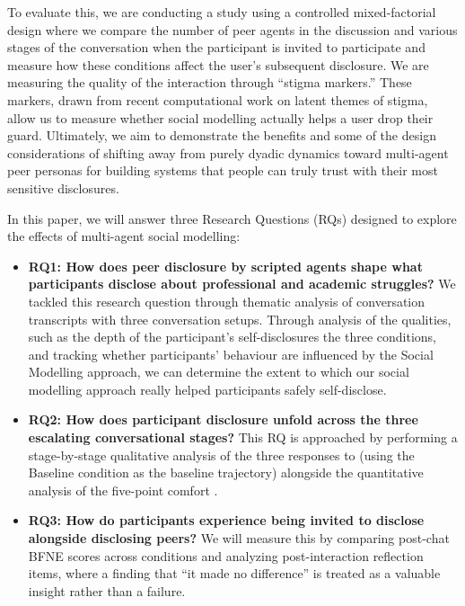 \documentclass[sigconf]{acmart}
\begin{document}
To evaluate this, we are conducting a  study using a controlled mixed-factorial design where we compare the number of peer agents in the discussion and various stages of the conversation when the participant is invited to participate and measure how these conditions affect the user's subsequent disclosure. We are measuring the quality of the interaction through ``stigma markers.'' These markers, drawn from recent computational work on latent themes of stigma, allow us to measure whether social modelling actually helps a user drop their guard. Ultimately, we aim to demonstrate the benefits and some of the design considerations of shifting away from purely dyadic dynamics toward multi-agent peer personas for building systems that people can truly trust with their most sensitive disclosures.

In this paper, we will answer three Research Questions (RQs) designed to explore the effects of multi-agent social modelling:

\begin{itemize}
    \item \textbf{RQ1: How does peer disclosure by scripted agents shape what participants disclose about professional and academic struggles?} We tackled this research question through thematic analysis of conversation transcripts with three conversation setups. Through analysis of the qualities, such as the depth of the participant's self-disclosures the three conditions, and tracking whether participants' behaviour are influenced by the Social Modelling approach, we can determine the extent to which our social modelling approach really helped participants safely self-disclose.
    
    \item \textbf{RQ2: How does participant disclosure unfold across the three escalating conversational stages?} This RQ is approached by performing a stage-by-stage qualitative analysis of the three responses to (using the Baseline condition as the baseline trajectory) alongside the quantitative analysis of the five-point comfort .
    
    \item \textbf{RQ3: How do participants experience being invited to disclose alongside disclosing peers?} We will measure this by comparing post-chat BFNE scores \cite{Leary1983BFNE} across conditions and analyzing post-interaction reflection items, where a finding that ``it made no difference'' is treated as a valuable insight rather than a failure.
\end{itemize}
\end{document}
